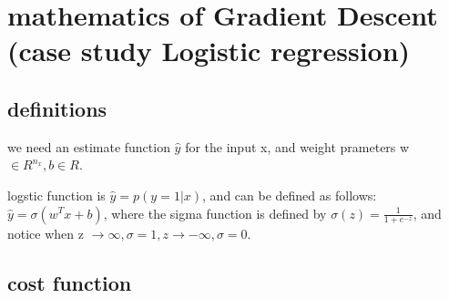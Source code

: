\documentclass[4apaper,12pt]{book}
\begin{document}
  \chapter{mathematics of Gradient Descent (case study Logistic regression)}

  \section{definitions}

  \begin{description}
  \item we need an estimate function $\hat{y}$ for the input x, and weight prameters w$\in R^{n_x}, b\in R$.
  \item logstic function is $\hat{y}=p(y=1|x)$, and can be defined as follows: $\hat{y}=\sigma(w^Tx+b)$, where the sigma function is defined by $\sigma(z)=\frac{1}{1+e^{-z}}$, and notice when z $\to \infty, \sigma = 1, z \to -\infty, \sigma =0$.
  \item
  \end{description}

  \section{cost function}
\end{document}
